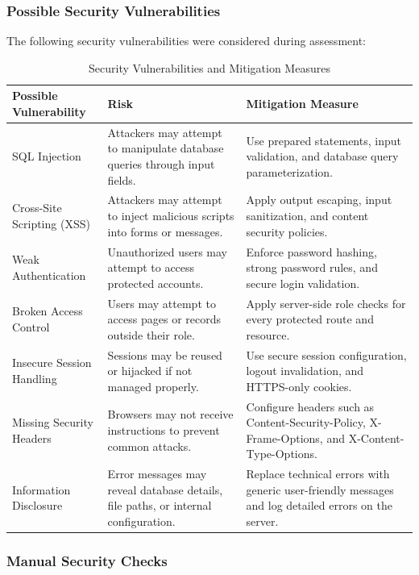 \subsubsection{Possible Security Vulnerabilities}

The following security vulnerabilities were considered during assessment:

\begin{table}[H]
\centering
\caption{Security Vulnerabilities and Mitigation Measures}
\begin{tabular}{p{4cm}p{5cm}p{5cm}}
\hline
\textbf{Possible Vulnerability} & \textbf{Risk} & \textbf{Mitigation Measure} \\
\hline
SQL Injection & Attackers may attempt to manipulate database queries through input fields. & Use prepared statements, input validation, and database query parameterization. \\
Cross-Site Scripting (XSS) & Attackers may attempt to inject malicious scripts into forms or messages. & Apply output escaping, input sanitization, and content security policies. \\
Weak Authentication & Unauthorized users may attempt to access protected accounts. & Enforce password hashing, strong password rules, and secure login validation. \\
Broken Access Control & Users may attempt to access pages or records outside their role. & Apply server-side role checks for every protected route and resource. \\
Insecure Session Handling & Sessions may be reused or hijacked if not managed properly. & Use secure session configuration, logout invalidation, and HTTPS-only cookies. \\
Missing Security Headers & Browsers may not receive instructions to prevent common attacks. & Configure headers such as Content-Security-Policy, X-Frame-Options, and X-Content-Type-Options. \\
Information Disclosure & Error messages may reveal database details, file paths, or internal configuration. & Replace technical errors with generic user-friendly messages and log detailed errors on the server. \\
\hline
\end{tabular}
\end{table}

\subsubsection{Manual Security Checks}

